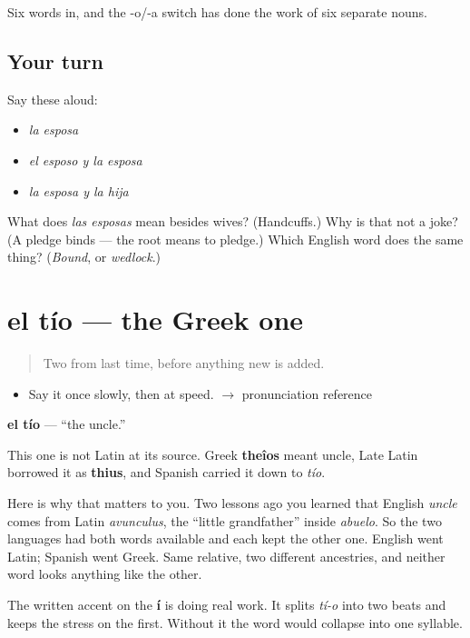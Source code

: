\begin{grammarlens}[title={What you've built}]
Six words in, and the -o/-a switch has done the work of six separate nouns.
\end{grammarlens}

\subsection*{Your turn}
Say these aloud:

\begin{itemize}
\raggedright
  \item \emph{la esposa}
  \item \emph{el esposo y la esposa}
  \item \emph{la esposa y la hija}
\end{itemize}

\begin{tcolorbox}[breakable,colback=teal!4,colframe=teal!35!black,title={Before you move on}]
What does \emph{las esposas} mean besides wives? (Handcuffs.) Why is that not a joke? (A pledge binds --- the root means to pledge.) Which English word does the same thing? (\emph{Bound}, or \emph{wedlock}.)
\end{tcolorbox}
\section[el tío]{el tío --- the Greek one}

\label{lesson:ES-C307-tio}



\begin{quote}
Two from last time, before anything new is added.
\end{quote}

\begin{sounds}
\begin{itemize}
\raggedright
  \item Say it once slowly, then at speed. $\to$ pronunciation reference
\end{itemize}
\end{sounds}

\begin{cousinweb}
\textbf{el tío} --- \textquotedblleft{}the uncle.\textquotedblright{}

This one is not Latin at its source. Greek \textbf{theîos} meant uncle, Late Latin borrowed it as \textbf{thius}, and Spanish carried it down to \emph{tío}.

Here is why that matters to you. Two lessons ago you learned that English \emph{uncle} comes from Latin \emph{avunculus}, the \textquotedblleft{}little grandfather\textquotedblright{} inside \emph{abuelo}. So the two languages had both words available and each kept the other one. English went Latin; Spanish went Greek. Same relative, two different ancestries, and neither word looks anything like the other.

The written accent on the \textbf{í} is doing real work. It splits \emph{tí-o} into two beats and keeps the stress on the first. Without it the word would collapse into one syllable.
\end{cousinweb}

